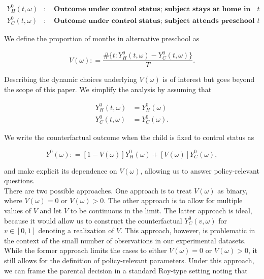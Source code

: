 \begin{eqnarray}
Y_H^0 \left( t, \omega \right) &:& \textbf{ Outcome under control status; subject stays at home in period $t$} \nonumber \\ 
Y_C^0 \left( t, \omega \right) &:& \textbf{ Outcome under control status; subject attends preschool in period $t$}  \nonumber
\end{eqnarray}

\noindent We define the proportion of months in alternative preschool as 

\begin{equation}
V \left ( \omega \right) : = \frac{\# \{ t: Y_H^0 \left( t, \omega \right) - Y_C^0 \left( t, \omega \right)  \} }{T}.
\end{equation}

\noindent Describing the dynamic choices underlying $V \left ( \omega \right)$ is of interest but goes beyond the scope of this paper. We simplify the analysis by assuming that 

\begin{align}
Y_H^0 \left( t, \omega \right) &= Y_H^0 \left( \omega \right) \nonumber \\
Y_C^0 \left( t, \omega \right) &= Y_C^0 \left( \omega \right).
\end{align}

\noindent We write the counterfactual outcome when the child is fixed to control status as 

\begin{equation}
Y^0 \left( \omega \right) : = \left[ 1 - V \left( \omega \right) \right] Y_H^0 \left( \omega \right) + \left[ V \left( \omega \right) \right] Y_C^0 \left( \omega \right), 
\end{equation}

\noindent and make explicit its dependence on $V \left( \omega \right)$, allowing us to answer policy-relevant questions.\\

\noindent There are two possible approaches. One approach is to treat $V \left( \omega \right)$ as binary, where $V \left( \omega \right) = 0$ or $V \left( \omega \right)  > 0$. The other approach is to allow for multiple values of $V$ and let $V$ to be continuous in the limit. The latter approach is ideal, because it would allow us to construct the counterfactual $Y_C^0 \left( v,  \omega \right) $ for $v \in [0 , 1]$ denoting a realization of $V$. This approach, however, is problematic in the context of the small number of observations in our experimental datasets. While the former approach limits the cases to either $V \left( \omega \right) = 0$ or $V \left( \omega \right)  > 0$, it still allows for the definition of policy-relevant parameters. Under this approach, we can frame the parental decision in a standard Roy-type setting noting that 

